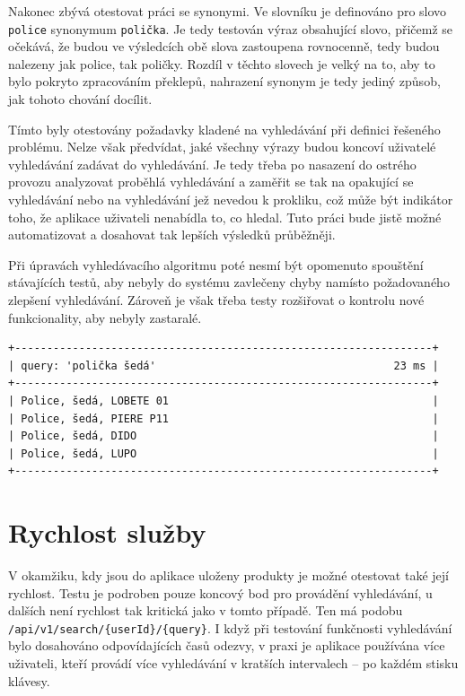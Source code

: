 \documentclass[FM,DP]{tulthesis}
\newenvironment{code}
    {\filbreak\captionsetup{type=listing}}{\filbreak}
\begin{document}
Nakonec zbývá otestovat práci se synonymi. Ve slovníku je definováno pro slovo \verb|police| synonymum
\verb|polička|. Je tedy testován výraz obsahující slovo, přičemž se očekává, že budou ve výsledcích obě
slova zastoupena rovnocenně, tedy budou nalezeny jak police, tak poličky. Rozdíl v těchto slovech
je velký na to, aby to bylo pokryto zpracováním překlepů, nahrazení synonym je tedy jediný způsob, 
jak tohoto chování docílit.

Tímto byly otestovány požadavky kladené na vyhledávání při definici řešeného problému. 
Nelze však předvídat, jaké všechny výrazy budou koncoví uživatelé vyhledávání zadávat do 
vyhledávání. Je tedy třeba po nasazení do ostrého provozu analyzovat proběhlá vyhledávání a
zaměřit se tak na opakující se vyhledávání nebo na vyhledávání jež nevedou k prokliku, což
může být indikátor toho, že aplikace uživateli nenabídla to, co hledal. Tuto práci
bude jistě možné automatizovat a dosahovat tak lepších výsledků průběžněji.

Při úpravách vyhledávacího algoritmu poté nesmí být opomenuto spouštění stávajících testů, 
aby nebyly do systému zavlečeny chyby namísto požadovaného zlepšení vyhledávání. Zároveň
je však třeba testy rozšiřovat o kontrolu nové funkcionality, aby nebyly zastaralé.

\begin{code}
\captionsetup{singlelinecheck=false,justification=raggedright}
\label{code:search-synonym}
\begin{verbatim}
+-----------------------------------------------------------------+
| query: 'polička šedá'                                     23 ms |
+-----------------------------------------------------------------+
| Police, šedá, LOBETE 01                                         |
| Police, šedá, PIERE P11                                         |
| Police, šedá, DIDO                                              |
| Police, šedá, LUPO                                              |
+-----------------------------------------------------------------+
\end{verbatim}
\end{code}

\section{Rychlost služby}

V okamžiku, kdy jsou do aplikace uloženy produkty je možné otestovat také její rychlost. Testu je 
podroben pouze koncový bod pro provádění vyhledávání, u dalších není rychlost tak kritická jako v tomto
případě. Ten má podobu \verb|/api/v1/search/{userId}/{query}|. I když při testování funkčnosti vyhledávání
bylo dosahováno odpovídajících časů odezvy, v praxi je aplikace používána více uživateli, kteří
provádí více vyhledávání v kratších intervalech -- po každém stisku klávesy.
\end{document}
